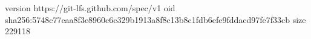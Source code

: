 version https://git-lfs.github.com/spec/v1
oid sha256:5748c77eaa8f3e8960c6c329b1913a8f8c13b8c1fdb6efe9fddacd97fe7f33cb
size 229118
